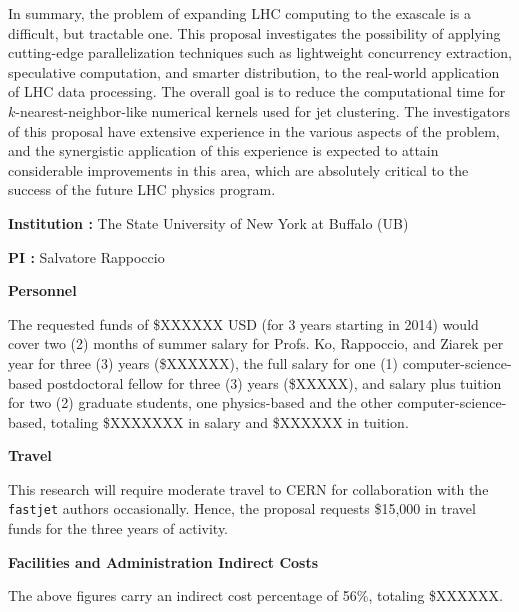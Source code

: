 \documentclass[12pt]{article}
\begin{document}
In summary, the problem of expanding LHC computing to the exascale is
a difficult, but tractable one. This proposal investigates the
possibility of applying cutting-edge parallelization techniques such
as lightweight concurrency extraction, speculative computation, and
smarter distribution, to the
real-world application of LHC data processing.
The overall goal is to reduce the computational time for
$k$-nearest-neighbor-like numerical kernels used for jet
clustering. The investigators of this
proposal have extensive experience in the various aspects of the
problem, and the synergistic application of this experience is
expected to attain considerable improvements in this area, which
are absolutely critical to the success of the future LHC physics
program. 


{}
%

\newpage
{}
\renewcommand{\thepage} {B--\arabic{page}}

\bigskip
{\bf Institution : } The State University of New York at Buffalo (UB)

{\bf PI : } Salvatore Rappoccio


\bigskip
{\bf Personnel}
\bigskip


The requested funds of \$XXXXXX USD (for 3 years starting in 2014)
would cover two (2) months of summer salary for Profs. Ko, Rappoccio,
and Ziarek per year for three (3) years (\$XXXXXX), the full salary for 
one (1) computer-science-based postdoctoral fellow for three (3) years
(\$XXXXX), and salary plus tuition for two (2) graduate students, one
physics-based and the other computer-science-based, totaling \$XXXXXXX in
salary and \$XXXXXX in tuition. 


\bigskip
{\bf Travel}
\bigskip

This research will require moderate travel to CERN for collaboration
with the {\tt fastjet} authors occasionally. Hence, the proposal requests
\$15,000 in travel funds for the three years of activity. 

\bigskip
{\bf Facilities and Administration Indirect Costs}
\bigskip

The above figures carry an indirect cost
percentage of 56\%, totaling \$XXXXXX.



\newpage
{}
\renewcommand{\thepage} {C--\arabic{page}}
\end{document}
